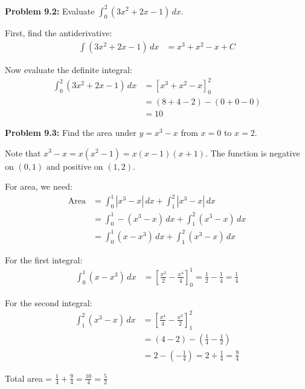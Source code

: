 \documentclass[12pt,a4paper]{book}
\theoremstyle{definition}
\begin{document}
\begin{solution}
\textbf{Problem 9.2:} Evaluate $\int_0^2 (3x^2 + 2x - 1) \, dx$.

First, find the antiderivative:
\begin{align}
\int (3x^2 + 2x - 1) \, dx &= x^3 + x^2 - x + C
\end{align}

Now evaluate the definite integral:
\begin{align}
\int_0^2 (3x^2 + 2x - 1) \, dx &= [x^3 + x^2 - x]_0^2\\
&= (8 + 4 - 2) - (0 + 0 - 0)\\
&= 10
\end{align}
\end{solution}

\begin{solution}
\textbf{Problem 9.3:} Find the area under $y = x^3 - x$ from $x = 0$ to $x = 2$.

Note that $x^3 - x = x(x^2 - 1) = x(x - 1)(x + 1)$.
The function is negative on $(0, 1)$ and positive on $(1, 2)$.

For area, we need:
\begin{align}
\text{Area} &= \int_0^1 |x^3 - x| \, dx + \int_1^2 |x^3 - x| \, dx\\
&= \int_0^1 -(x^3 - x) \, dx + \int_1^2 (x^3 - x) \, dx\\
&= \int_0^1 (x - x^3) \, dx + \int_1^2 (x^3 - x) \, dx
\end{align}

For the first integral:
\begin{align}
\int_0^1 (x - x^3) \, dx &= \left[ \frac{x^2}{2} - \frac{x^4}{4} \right]_0^1 = \frac{1}{2} - \frac{1}{4} = \frac{1}{4}
\end{align}

For the second integral:
\begin{align}
\int_1^2 (x^3 - x) \, dx &= \left[ \frac{x^4}{4} - \frac{x^2}{2} \right]_1^2\\
&= \left( 4 - 2 \right) - \left( \frac{1}{4} - \frac{1}{2} \right)\\
&= 2 - \left( -\frac{1}{4} \right) = 2 + \frac{1}{4} = \frac{9}{4}
\end{align}

Total area = $\frac{1}{4} + \frac{9}{4} = \frac{10}{4} = \frac{5}{2}$
\end{solution}
\end{document}
